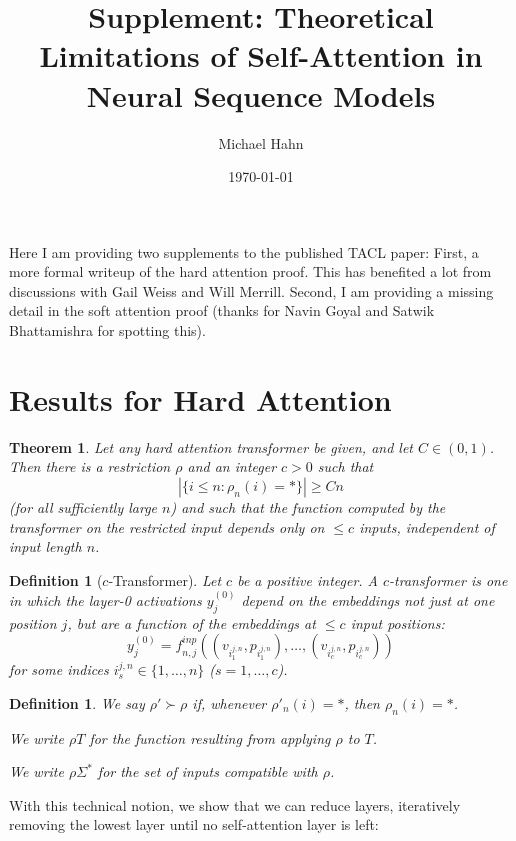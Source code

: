 \documentclass[11pt,letterpaper]{article}
\title{Supplement: Theoretical Limitations of Self-Attention in Neural Sequence Models}
\author{Michael Hahn}
\date{\today}
\newcounter{theorem}
\newtheorem{thm}[theorem]{Theorem}
\newtheorem{defin}[theorem]{Definition}
\begin{document}
\maketitle

Here I am providing two supplements to the published TACL paper:
First, a more formal writeup of the hard attention proof. This has benefited a lot from discussions with Gail Weiss and Will Merrill.
Second, I am providing a missing detail in the soft attention proof (thanks for Navin Goyal and Satwik Bhattamishra for spotting this).


\section{Results for Hard Attention}

\begin{thm}\label{thm:hardmax-main}
Let any hard attention transformer be given, and let $C \in (0,1)$.
Then there is a restriction $\rho$ and an integer $c > 0$ such that 
$$|\{i \leq n: \rho_n(i) = *\}| \geq Cn$$
(for all sufficiently large $n$) and such that the function computed by the transformer on the restricted input depends only on $\leq c$ inputs, independent of input length $n$.
\end{thm}


\begin{defin}[$c$-Transformer]
Let $c$ be a positive integer. A $c$-transformer is one in which the layer-0 activations $y_j^{(0)}$ depend on the embeddings not just at one position $j$, but are a function of the embeddings at $\leq c$ input positions:
\begin{equation}
    y_j^{(0)} = f^{inp}_{n,j}((v_{i_1^{j,n}}, p_{i_1^{j,n}}), \dots, (v_{i_c^{j,n}}, p_{i_c^{j,n}} ))
\end{equation}
for some indices ${i_s^{j,n}} \in \{1, \dots, n\}$ ($s = 1, \dots, c$).
\end{defin}

\begin{defin}
We say $\rho' \succ \rho$ if, whenever $\rho'_n(i) = *$, then $\rho_n(i) = *$.

We write $\rho T$ for the function resulting from applying $\rho$ to $T$.

We write $\rho\Sigma^*$ for the set of inputs compatible with $\rho$.
\end{defin}


With this technical notion, we show that we can reduce layers, iteratively removing the lowest layer until no self-attention layer is left:
\end{document}
